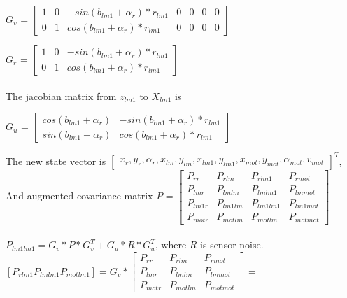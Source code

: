 \documentclass[11pt,a4paper]{article}
\begin{document}
\noindent $G_{v}$ = $  \begin{bmatrix} 1 & 0 & - sin(b_{lm1}+\alpha_{r})*r_{lm1} & 0 & 0 & 0 & 0\\
                             0 & 1 &  cos(b_{lm1}+\alpha_{r})*r_{lm1}  & 0 & 0 & 0 & 0\end{bmatrix}$


                       
\noindent $G_{r}$ = $  \begin{bmatrix} 1 & 0 & - sin(b_{lm1}+\alpha_{r})*r_{lm1}\\
                             0 & 1 &  cos(b_{lm1}+\alpha_{r})*r_{lm1} \end{bmatrix}$
\\
\\
\noindent The jacobian matrix from $z_{lm1}$ to $X_{lm1}$ is 

$G_{u}$ = $  \begin{bmatrix}  cos(b_{lm1}+\alpha_{r})    & - sin(b_{lm1}+\alpha_{r})*r_{lm1}  \\
                                 sin(b_{lm1}+\alpha_{r}) &  cos(b_{lm1}+\alpha_{r})*r_{lm1} \end{bmatrix}$

\noindent The new state vector is $\begin{bmatrix} x_{r}, y_{r}, \alpha_{r}, x_{lm}, y_{lm}, x_{lm1}, y_{lm1},  x_{mot}, y_{mot}, \alpha_{mot}, v_{mot} \end{bmatrix}^{T}$, 
\\

\noindent And augmented covariance matrix $P$ = $\begin{bmatrix} P_{rr} & P_{rlm} & P_{rlm1} & P_{rmot}\\
										   P_{lmr}& P_{lmlm} & P_{lmlm1} & P_{lmmot}\\
										   P_{lm1r}& P_{lm1lm} & P_{lm1lm1} & P_{lm1mot}\\ 
										   P_{motr}& P_{motlm} & P_{motlm} & P_{motmot}\end{bmatrix}$
\\
\\
\noindent $P_{lm1lm1} = G_{v}*P*G_{v}^{T} + G_{u}*R*G_{u}^{T}$, where $R$ is sensor noise.
\\

\noindent $[P_{rlm1}  P_{lmlm1}  P_{motlm1}] = G_{v}*\begin{bmatrix} P_{rr} & P_{rlm} & P_{rmot}\\
										   P_{lmr}& P_{lmlm}  & P_{lmmot}\\
										   P_{motr}& P_{motlm}  & P_{motmot}\end{bmatrix}$ =
										   
\end{document}
